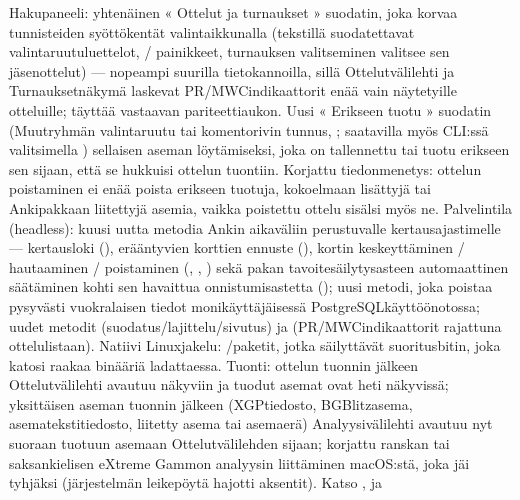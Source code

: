 \documentclass[letterpaper,10pt,finnish]{sphinxmanual}
\begin{document}
\begin{savenotes}
\begin{longtable}{}
\begin{varwidth}[t]{}
Hakupaneeli: yhtenäinen « Ottelut ja turnaukset » \sphinxhyphen{}suodatin, joka korvaa tunnisteiden syöttökentät valintaikkunalla (tekstillä suodatettavat valintaruutuluettelot, / \sphinxhyphen{}painikkeet, turnauksen valitseminen valitsee sen jäsenottelut) — nopeampi suurilla tietokannoilla, sillä Ottelut\sphinxhyphen{}välilehti ja Turnaukset\sphinxhyphen{}näkymä laskevat PR/MWC\sphinxhyphen{}indikaattorit enää vain näytetyille otteluille;  täyttää vastaavan pariteettiaukon. Uusi « Erikseen tuotu » \sphinxhyphen{}suodatin (Muut\sphinxhyphen{}ryhmän valintaruutu tai komentorivin \sphinxhyphen{}tunnus, ; saatavilla myös CLI:ssä valitsimella ) sellaisen aseman löytämiseksi, joka on tallennettu tai tuotu erikseen sen sijaan, että se hukkuisi ottelun tuontiin. Korjattu tiedonmenetys: ottelun poistaminen ei enää poista erikseen tuotuja, kokoelmaan lisättyjä tai Anki\sphinxhyphen{}pakkaan liitettyjä asemia, vaikka poistettu ottelu sisälsi myös ne. Palvelintila (headless): kuusi uutta metodia Ankin aikaväliin perustuvalle kertausajastimelle — kertausloki (), erääntyvien korttien ennuste (), kortin keskeyttäminen / hautaaminen / poistaminen (, , ) sekä pakan tavoitesäilytysasteen automaattinen säätäminen kohti sen havaittua onnistumisastetta (); uusi \sphinxhyphen{}metodi, joka poistaa pysyvästi vuokralaisen tiedot monikäyttäjäisessä PostgreSQL\sphinxhyphen{}käyttöönotossa; uudet metodit  (suodatus/lajittelu/sivutus) ja  (PR/MWC\sphinxhyphen{}indikaattorit rajattuna ottelulistaan). Natiivi Linux\sphinxhyphen{}jakelu: /\sphinxhyphen{}paketit, jotka säilyttävät suoritusbitin, joka katosi raakaa binääriä ladattaessa. Tuonti: ottelun tuonnin jälkeen Ottelut\sphinxhyphen{}välilehti avautuu näkyviin ja tuodut asemat ovat heti näkyvissä; yksittäisen aseman tuonnin jälkeen (XGP\sphinxhyphen{}tiedosto, BGBlitz\sphinxhyphen{}asema, asematekstitiedosto, liitetty asema tai asemaerä) Analyysi\sphinxhyphen{}välilehti avautuu nyt suoraan tuotuun asemaan Ottelut\sphinxhyphen{}välilehden sijaan; korjattu ranskan\sphinxhyphen{} tai saksankielisen eXtreme Gammon \sphinxhyphen{}analyysin liittäminen macOS:stä, joka jäi tyhjäksi (järjestelmän leikepöytä hajotti aksentit). Katso {\hyperref[\detokenize{mode_headless:headless}]{}}, {\hyperref[\detokenize{cmd_mode:cmd-mode}]{}} ja 
\end{varwidth}
\end{longtable}
\end{savenotes}
\end{document}
